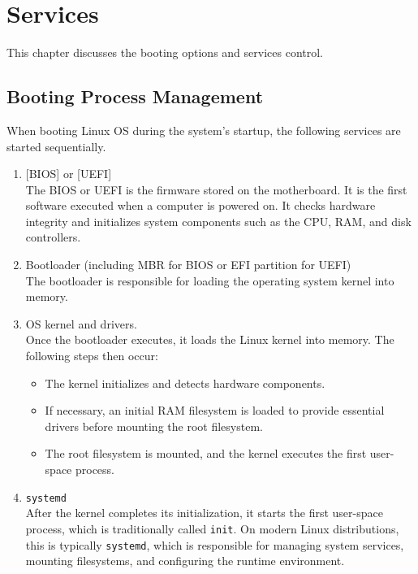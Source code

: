 \chapter{Services}

This chapter discusses the booting options and services control.

\section{Booting Process Management}

When booting Linux OS during the system's startup, the following services are started sequentially.

\begin{enumerate}
  \item {}[BIOS] or [UEFI] \\
  The BIOS or UEFI is the firmware stored on the motherboard. It is the first software executed when a computer is powered on. It checks hardware integrity and initializes system components such as the CPU, RAM, and disk controllers.
  
  \item Bootloader (including MBR for BIOS or EFI partition for UEFI) \\
  The bootloader is responsible for loading the operating system kernel into memory.
  
  \item OS kernel and drivers. \\
  Once the bootloader executes, it loads the Linux kernel into memory. The following steps then occur:
  \begin{itemize}
      \item The kernel initializes and detects hardware components.
      \item If necessary, an initial RAM filesystem is loaded to provide essential drivers before mounting the root filesystem.
      \item The root filesystem is mounted, and the kernel executes the first user-space process.
  \end{itemize}
  
  \item \texttt{systemd} \\
  After the kernel completes its initialization, it starts the first user-space process, which is traditionally called \texttt{init}. On modern Linux distributions, this is typically \texttt{systemd}, which is responsible for managing system services, mounting filesystems, and configuring the runtime environment.
  

\end{enumerate}
